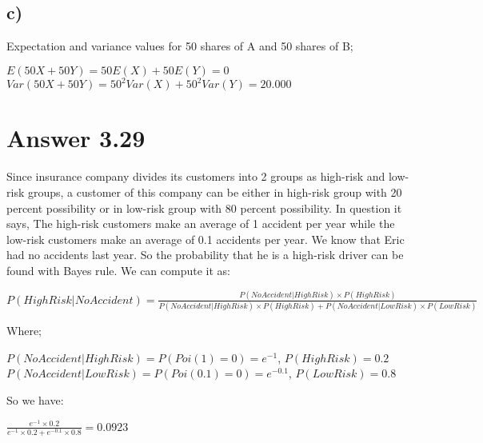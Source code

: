 \documentclass[12pt]{article}
\begin{document}
\subsection*{c)}
Expectation and variance values for 50 shares of A and 50 shares of B;
\begin{center}
$E(50X + 50Y) = 50E(X) + 50E(Y) = 0$\\$Var(50X + 50Y) = 50^2 Var(X) + 50^2 Var(Y) = 20.000$
\end{center}

\section*{Answer 3.29}
Since insurance company divides its customers into 2 groups as high-risk and low-risk groups, a customer of this company can be either in high-risk group with 20 percent possibility or in low-risk group with 80 percent possibility. In question it says, The high-risk customers make an average of 1 accident per year while the low-risk customers make an average of 0.1 accidents per year. We know that Eric had no accidents last year. So the probability that he is a high-risk driver can be found with Bayes rule. We can compute it as:

\begin{center}
$P(High Risk|No Accident)= \frac{P(No Accident|High Risk)\times P(High Risk)}{P(No Accident|High Risk)\times P(High Risk) + P(No Accident|Low Risk)\times P(Low Risk)}$
\end{center}
Where;
\begin{center}
$P(No Accident|High Risk)=P(Poi(1)=0)=e^{-1}$, $P(High Risk)=0.2$\\
$P(No Accident|Low Risk)=P(Poi(0.1)=0)=e^{-0.1}$, $P(Low Risk)=0.8$
\end{center}
So we have:
\begin{center}
$\frac{e^{-1}\times 0.2}{e^{-1}\times 0.2 + e^{-0.1}\times 0.8}=0.0923$
\end{center}
\end{document}
